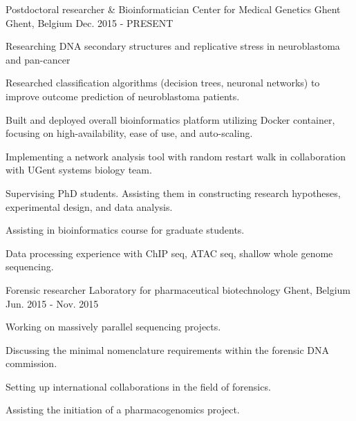 

\begin{cventries}

  \cventry
    {Postdoctoral researcher \& Bioinformatician} %
    {Center for Medical Genetics Ghent} %
    {Ghent, Belgium} %
    {Dec. 2015 - PRESENT} %
    {
      \begin{cvitems} %
        \item {Researching DNA secondary structures and replicative
            stress in neuroblastoma and pan-cancer}
        \item {Researched classification algorithms (decision trees,
            neuronal networks) to improve outcome prediction of
            neuroblastoma patients.}
      \item {Built and deployed overall bioinformatics platform
          utilizing Docker container, focusing on high-availability,
          ease of use, and auto-scaling.}
      \item {Implementing a network analysis tool with random restart
          walk in collaboration with UGent systems biology team.}
      \item {Supervising PhD students. Assisting them in constructing
          research hypotheses, experimental design, and data
          analysis.}
      \item {Assisting in bioinformatics course for graduate
          students.}
      \item {Data processing experience with ChIP seq, ATAC seq,
          shallow whole genome sequencing.}
      \end{cvitems}
    }

  \cventry
    {Forensic researcher} %
    {Laboratory for pharmaceutical biotechnology} %
    {Ghent, Belgium} %
    {Jun. 2015 - Nov. 2015} %
    {
      \begin{cvitems} %
        \item {Working on massively parallel sequencing projects.}
        \item {Discussing the minimal nomenclature requirements within
          the forensic DNA commission.}
        \item {Setting up international collaborations in the field of
            forensics.}
        \item {Assisting the initiation of a pharmacogenomics project.}
      \end{cvitems}
    }


\end{cventries}
